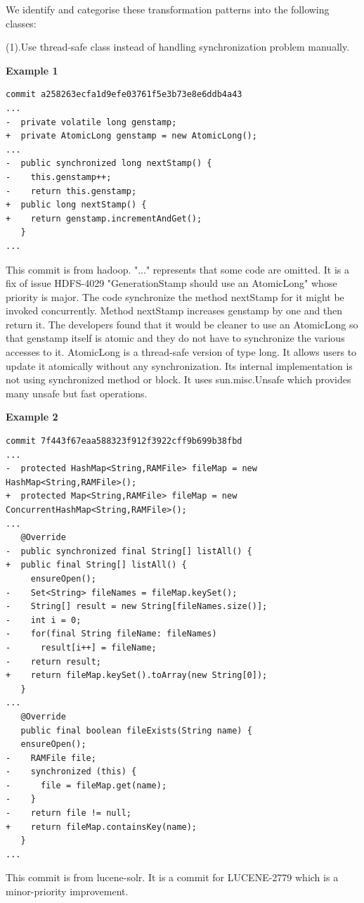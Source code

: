 \documentclass{sig-alternate-05-2015}
\begin{document}
We identify and categorise these transformation patterns into the following classes:

(1).Use thread-safe class instead of handling synchronization problem manually.

\textbf{Example 1}
\lstset{language=java, numbers=left, frame=single}
\begin{lstlisting}
commit a258263ecfa1d9efe03761f5e3b73e8e6ddb4a43
...
-  private volatile long genstamp;
+  private AtomicLong genstamp = new AtomicLong();
...
-  public synchronized long nextStamp() {
-    this.genstamp++;
-    return this.genstamp;
+  public long nextStamp() {
+    return genstamp.incrementAndGet();
   }
...
\end{lstlisting}

This commit is from hadoop. "..." represents that some code are omitted. It is a fix of issue HDFS-4029 "GenerationStamp should use an AtomicLong" whose priority is major. The code synchronize the method nextStamp for it might be invoked concurrently. Method nextStamp increases genstamp by one and then return it. The developers found that it would be cleaner to use an AtomicLong so that genstamp itself is atomic and they do not have to synchronize the various accesses to it. AtomicLong is a thread-safe version of type long. It allows users to update it atomically without any synchronization. Its internal implementation is not using synchronized method or block. It uses sun.misc.Unsafe which provides many unsafe but fast operations.

\textbf{Example 2}
\begin{lstlisting}
commit 7f443f67eaa588323f912f3922cff9b699b38fbd
...
-  protected HashMap<String,RAMFile> fileMap = new HashMap<String,RAMFile>();
+  protected Map<String,RAMFile> fileMap = new ConcurrentHashMap<String,RAMFile>();
...
   @Override
-  public synchronized final String[] listAll() {
+  public final String[] listAll() {
     ensureOpen();
-    Set<String> fileNames = fileMap.keySet();
-    String[] result = new String[fileNames.size()];
-    int i = 0;
-    for(final String fileName: fileNames) 
-      result[i++] = fileName;
-    return result;
+    return fileMap.keySet().toArray(new String[0]);
   }
...
   @Override
   public final boolean fileExists(String name) {
   ensureOpen();
-    RAMFile file;
-    synchronized (this) {
-      file = fileMap.get(name);
-    }
-    return file != null;
+    return fileMap.containsKey(name);
   }
...
\end{lstlisting}

This commit is from lucene-solr. It is a commit for LUCENE-2779 which is a minor-priority improvement.
\end{document}
